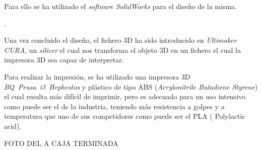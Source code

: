 Para ello se ha utilizado el \emph{software} \emph{SolidWorks} para el diseño de la misma.

.

Una vez concluido el diseño, el fichero 3D ha sido introducido en \emph{Ultimaker CURA}, un \emph{silicer} el cual nos transforma el objeto 3D en un fichero el cual la impresora 3D sea capaz de interpretar.

Para realizar la impresión, se ha utilizado una impresora 3D \emph{BQ~Prusa~i3~Hephestos} y plástico de tipo ABS (\emph{Acrylonitrile Butadiene Styrene}) el cual resulta más difícil de imprimir, pero es adecuado para un uso intensivo como puede ser el de la industria, teniendo más resistencia a golpes y a temperatura que uno de sus competidores como puede ser el PLA ( Polylactic acid).


FOTO DEL A CAJA TERMINADA

